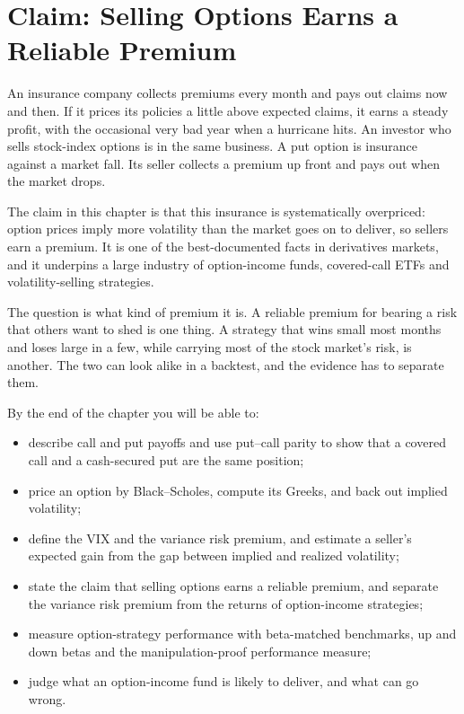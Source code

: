 \makeatletter
{}
\makeatother

\chapter{Claim: Selling Options Earns a Reliable Premium}
\label{ch:14}

An insurance company collects premiums every month and pays out claims now and then. If it prices its policies a little above expected claims, it earns a steady profit, with the occasional very bad year when a hurricane hits. An investor who sells stock-index options is in the same business. A put option is insurance against a market fall. Its seller collects a premium up front and pays out when the market drops.

The claim in this chapter is that this insurance is systematically overpriced: option prices imply more volatility than the market goes on to deliver, so sellers earn a premium. It is one of the best-documented facts in derivatives markets, and it underpins a large industry of option-income funds, covered-call ETFs and volatility-selling strategies.

The question is what kind of premium it is. A reliable premium for bearing a risk that others want to shed is one thing. A strategy that wins small most months and loses large in a few, while carrying most of the stock market's risk, is another. The two can look alike in a backtest, and the evidence has to separate them.

By the end of the chapter you will be able to:

\begin{itemize}
  \item describe call and put payoffs and use put--call parity to show that a covered call and a cash-secured put are the same position;
  \item price an option by Black--Scholes, compute its Greeks, and back out implied volatility;
  \item define the VIX and the variance risk premium, and estimate a seller's expected gain from the gap between implied and realized volatility;
  \item state the claim that selling options earns a reliable premium, and separate the variance risk premium from the returns of option-income strategies;
  \item measure option-strategy performance with beta-matched benchmarks, up and down betas and the manipulation-proof performance measure;
  \item judge what an option-income fund is likely to deliver, and what can go wrong.
\end{itemize}

